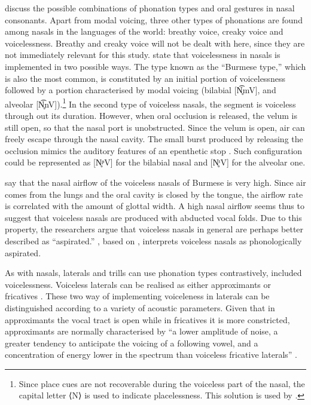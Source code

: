\documentclass[11pt,a4paper,openany]{memoir}\usepackage[]{graphicx}\usepackage[]{color}
\begin{document}
\citet{ladefoged1996} discuss the possible combinations of phonation types and oral gestures in nasal consonants.
Apart from modal voicing, three other types of phonations are found among nasals in the languages of the world: breathy voice, creaky voice and voicelessness.
Breathy and creaky voice will not be dealt with here, since they are not immediately relevant for this study.
\citet{bhaskararao1991} state that voicelessness in nasals is implemented in two possible ways.
The type known as the ``Burmese type,'' which is also the most common, is constituted by an initial portion of voicelessness followed by a portion characterised by modal voicing (bilabial [N̥͡mV], and alveolar [N̥͡nV]).\footnote{Since place cues are not recoverable during the voiceless part of the nasal, the capital letter ⟨N⟩ is used to indicate placelessness.
This solution is used by \citet{silverman2012}.
}
In the second type of voiceless nasals, the segment is voiceless through out its duration.
However, when oral occlusion is released, the velum is still open, so that the nasal port is unobstructed.
Since the velum is open, air can freely escape through the nasal cavity.
The small burst produced by releasing the occlusion mimics the auditory features of an epenthetic stop \citep[84]{bhaskararao1991}.
Such configuration could be represented as [N̥ᵖV] for the bilabial nasal and [N̥ᵗV] for the alveolar one.

\citet[111]{ladefoged1996} say that the nasal airflow of the voiceless nasals of Burmese is very high.
Since air comes from the lungs and the oral cavity is closed by the tongue, the airflow rate is correlated with the amount of glottal width.
A high nasal airflow seems thus to suggest that voiceless nasals are produced with abducted vocal folds.
Due to this property, the researchers argue that voiceless nasals in general are perhaps better described as ``aspirated.''
\citet[82]{kehrein2002}, based on \citet{ladefoged1996}, interprets voiceless nasals as phonologically aspirated.


As with nasals, laterals and trills can use phonation types contrastively, included voicelessness.
Voiceless laterals can be realised as either approximants or fricatives \citet{ladefoged1996}.
These two way of implementing voiceleness in laterals can be distinguished according to a variety of acoustic parameters.
Given that in approximants the vocal tract is open while in fricatives it is more constricted, approximants are normally characterised by ``a lower amplitude of noise, a greater tendency to anticipate the voicing of a following vowel, and a concentration of energy lower in the spectrum than voiceless fricative laterals'' \citep[198]{ladefoged1996}.
\end{document}
